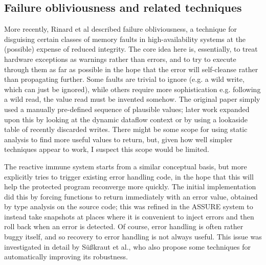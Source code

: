 \subsection{Failure obliviousness and related techniques}
More recently, Rinard et al\cite{Rinard2004} described failure
obliviousness, a technique for disguising certain classes of memory
faults in high-availability systems at the (possible) expense of
reduced integrity.  The core idea here is, essentially, to treat
hardware exceptions as warnings rather than errors, and to try to
execute through them as far as possible in the hope that the error
will self-cleanse rather than propagating further.  Some faults are
trivial to ignore (e.g. a wild write, which can just be ignored),
while others require more sophistication e.g. following a wild read,
the value read must be invented somehow.  The original paper simply
used a manually pre-defined sequence of plausible values; later work
expanded upon this by looking at the dynamic dataflow
context\cite{Nagarajan2009} or by using a lookaside table of recently
discarded writes\cite{Rinard2005a}.  There might be some scope for
using static analysis to find more useful values to return, but, given
how well simpler techniques appear to work, I suspect this scope would
be limited.

The reactive immune system\cite{Sidiroglou2005} starts from a similar
conceptual basis, but more explicitly tries to trigger existing error
handling code, in the hope that this will help the protected program
reconverge more quickly.  The initial implementation did this by
forcing functions to return immediately with an error value, obtained
by type analysis on the source code; this was refined in the ASSURE
system\cite{Sidiroglou2005} to instead take snapshots at places where
it is convenient to inject errors and then roll back when an error is
detected.  Of course, error handling is often rather buggy itself, and
so recovery to error handling is not always useful.  This issue was
investigated in detail by S\"{u}\ss{}kraut et al.\cite{Susskraut2006},
who also propose some techniques for automatically improving its
robustness.

